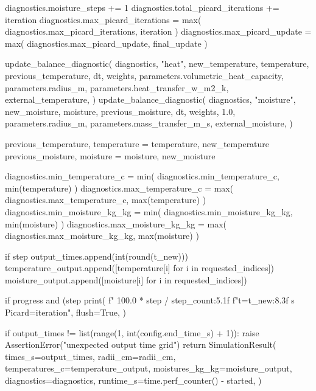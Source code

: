 \documentclass[withoutpreface,bwprint]{cumcmthesis}
\begin{document}
\begin{PythonCode}
        diagnostics.moisture_steps += 1
        diagnostics.total_picard_iterations += iteration
        diagnostics.max_picard_iterations = max(
            diagnostics.max_picard_iterations, iteration
        )
        diagnostics.max_picard_update = max(
            diagnostics.max_picard_update, final_update
        )

        update_balance_diagnostic(
            diagnostics,
            "heat",
            new_temperature,
            temperature,
            previous_temperature,
            dt,
            weights,
            parameters.volumetric_heat_capacity,
            parameters.radius_m,
            parameters.heat_transfer_w_m2_k,
            external_temperature,
        )
        update_balance_diagnostic(
            diagnostics,
            "moisture",
            new_moisture,
            moisture,
            previous_moisture,
            dt,
            weights,
            1.0,
            parameters.radius_m,
            parameters.mass_transfer_m_s,
            external_moisture,
        )

        previous_temperature, temperature = temperature, new_temperature
        previous_moisture, moisture = moisture, new_moisture

        diagnostics.min_temperature_c = min(
            diagnostics.min_temperature_c, min(temperature)
        )
        diagnostics.max_temperature_c = max(
            diagnostics.max_temperature_c, max(temperature)
        )
        diagnostics.min_moisture_kg_kg = min(
            diagnostics.min_moisture_kg_kg, min(moisture)
        )
        diagnostics.max_moisture_kg_kg = max(
            diagnostics.max_moisture_kg_kg, max(moisture)
        )

        if step %
            output_times.append(int(round(t_new)))
            temperature_output.append([temperature[i] for i in requested_indices])
            moisture_output.append([moisture[i] for i in requested_indices])

        if progress and (step %
            print(
                f"  {100.0 * step / step_count:5.1f}%
                f"t={t_new:8.3f} s  Picard={iteration}",
                flush=True,
            )

    if output_times != list(range(1, int(config.end_time_s) + 1)):
        raise AssertionError("unexpected output time grid")
    return SimulationResult(
        times_s=output_times,
        radii_cm=radii_cm,
        temperatures_c=temperature_output,
        moistures_kg_kg=moisture_output,
        diagnostics=diagnostics,
        runtime_s=time.perf_counter() - started,
    )
\end{PythonCode}
\end{document}
